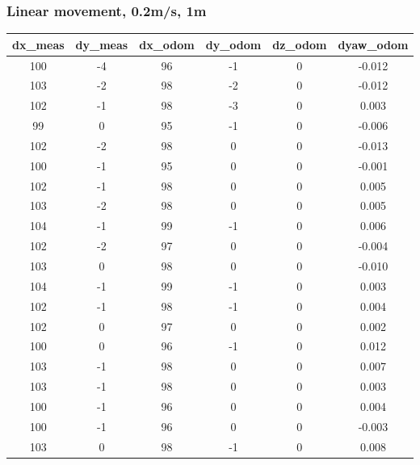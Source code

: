 \documentclass[a4paper, 12pt]{article}
\begin{document}
    \subsubsection{Linear movement, 0.2m/s, 1m}
    \begin{table}[H]
    \scriptsize
    \begin{tabular}{@{}cccccc@{}}
    \toprule
    \textbf{dx\_meas} & \textbf{dy\_meas} & \textbf{dx\_odom} & \textbf{dy\_odom} & \textbf{dz\_odom} & \textbf{dyaw\_odom} \\ \midrule
    100          & -4           & 96       & -1       & 0        & -0.012     \\
    103          & -2           & 98       & -2       & 0        & -0.012     \\
    102          & -1           & 98       & -3       & 0        & 0.003      \\
    99           & 0            & 95       & -1       & 0        & -0.006     \\
    102          & -2           & 98       & 0        & 0        & -0.013     \\
    100          & -1           & 95       & 0        & 0        & -0.001     \\
    102          & -1           & 98       & 0        & 0        & 0.005      \\
    103          & -2           & 98       & 0        & 0        & 0.005      \\
    104          & -1           & 99       & -1       & 0        & 0.006      \\
    102          & -2           & 97       & 0        & 0        & -0.004     \\
    103          & 0            & 98       & 0        & 0        & -0.010     \\
    104          & -1           & 99       & -1       & 0        & 0.003      \\
    102          & -1           & 98       & -1       & 0        & 0.004      \\
    102          & 0            & 97       & 0        & 0        & 0.002      \\
    100          & 0            & 96       & -1       & 0        & 0.012      \\
    103          & -1           & 98       & 0        & 0        & 0.007      \\
    103          & -1           & 98       & 0        & 0        & 0.003      \\
    100          & -1           & 96       & 0        & 0        & 0.004      \\
    100          & -1           & 96       & 0        & 0        & -0.003     \\
    103          & 0            & 98       & -1       & 0        & 0.008      \\ \bottomrule
    \end{tabular}
    \end{table}
\end{document}
